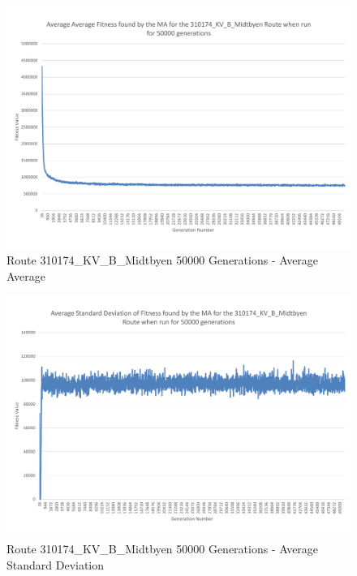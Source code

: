 \begin{landscape}
\begin{figure}[thbp]
	\centerline{\includegraphics[height=0.945\textwidth]{figures/Trondheim_graphs/KV_B/KV_B-all_average_average.pdf}}
	\caption{Route 310174\_KV\_B\_Midtbyen 50000 Generations - Average Average}
	\label{fig:KV_B_50k_aa}
\end{figure}
\end{landscape}

\begin{landscape}
\begin{figure}[thbp]
	\centerline{\includegraphics[height=0.945\textwidth]{figures/Trondheim_graphs/KV_B/KV_B-all_average_standard_deviation.pdf}}
	\caption{Route 310174\_KV\_B\_Midtbyen 50000 Generations - Average Standard Deviation}
	\label{fig:KV_B_50k_astd}
\end{figure}
\end{landscape}

